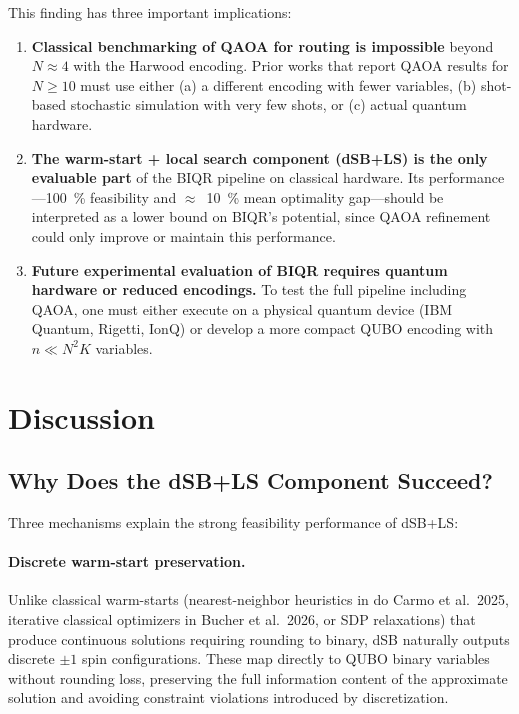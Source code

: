 \documentclass[11pt,a4paper]{article}
\theoremstyle{definition}
\begin{document}
This finding has three important implications:
\begin{enumerate}
    \item \textbf{Classical benchmarking of QAOA for routing is impossible} beyond $N \approx 4$ with the Harwood encoding. Prior works that report QAOA results for $N \geq 10$ must use either (a) a different encoding with fewer variables, (b) shot-based stochastic simulation with very few shots, or (c) actual quantum hardware.
    \item \textbf{The warm-start + local search component (dSB+LS) is the only evaluable part} of the BIQR pipeline on classical hardware. Its performance---\SI{100}{\percent} feasibility and $\approx$~\SI{10}{\percent} mean optimality gap---should be interpreted as a lower bound on BIQR's potential, since QAOA refinement could only improve or maintain this performance.
    \item \textbf{Future experimental evaluation of BIQR requires quantum hardware or reduced encodings.} To test the full pipeline including QAOA, one must either execute on a physical quantum device (IBM Quantum, Rigetti, IonQ) or develop a more compact QUBO encoding with $n \ll N^2 K$ variables.
\end{enumerate}

\section{Discussion}\label{sec:discussion}

\subsection{Why Does the dSB+LS Component Succeed?}

Three mechanisms explain the strong feasibility performance of dSB+LS:

\paragraph{Discrete warm-start preservation.} Unlike classical warm-starts (nearest-neighbor heuristics in do Carmo et al.\ 2025, iterative classical optimizers in Bucher et al.\ 2026, or SDP relaxations) that produce continuous solutions requiring rounding to binary, dSB naturally outputs discrete $\pm 1$ spin configurations. These map directly to QUBO binary variables without rounding loss, preserving the full information content of the approximate solution and avoiding constraint violations introduced by discretization.
\end{document}
